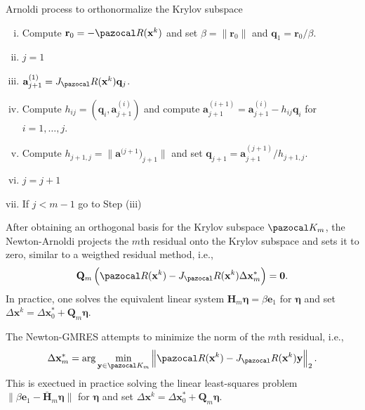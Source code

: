 \begin{framedbox}[htbp]
  \caption{Arnoldi process to orthonormalize the Krylov subspace}
  \label{box:arnoldi_process}
  \begin{center}
    \begin{minipage}{0.9\textwidth}
    \begin{enumerate}[(i)]
      \item Compute \(\mathbf r_0 = -\pazocal R(\mathbf x^k)\) and set \(\beta = \|\mathbf r_0\|\) and \(\mathbf q_1 = \mathbf r_0/\beta\).
      \item \(j=1\)
      \item \(\mathbf a^{(1)}_{j+1} = J_\pazocal R(\mathbf x^k) \mathbf q_j\).
      \item Compute \(h_{ij}=(\mathbf q_i, \mathbf a^{(i)}_{j+1})\) and compute \(\mathbf a^{(i+1)}_{j+1} = \mathbf a^{(i)}_{j+1} - h_{ij} \mathbf q_i\) for \(i=1,\dots,j\).
      \item Compute \(h_{j+1,j}=\|\mathbf a^{(j+1})_{j+1}\|\) and set \(\mathbf q_{j+1} = \mathbf a^{(j+1)}_{j+1}/h_{j+1,j}\).
      \item \(j=j+1\)
      \item If \(j<m-1\) go to Step (iii)
    \end{enumerate}
    \end{minipage}
  \end{center}
\end{framedbox}

After obtaining an orthogonal basis for the Krylov subspace \(\pazocal K_m\), the Newton-Arnoldi projects the \(m\)th residual onto the Krylov subspace and sets it to zero, similar to a weigthed residual method, i.e.,
\begin{equation}
  \mathbf Q_m \left(\pazocal R(\mathbf x^k) - J_\pazocal R(\mathbf x^k)\Delta \mathbf x^*_m\right) = \mathbf 0.
\end{equation}
In practice, one solves the equivalent linear system \(\mathbf H_m \boldsymbol{\eta} = \beta \mathbf e_1\) for \(\boldsymbol{\eta}\) and set \(\Delta \mathbf x^k  =\Delta \mathbf x^*_0 + \mathbf Q_m\boldsymbol \eta\).

The Newton-GMRES attempts to minimize the norm of the \(m\)th residual, i.e.,
\begin{equation}
  \Delta \mathbf x^*_m = \arg\min_{\mathbf y\in \pazocal K_m} \left\|\pazocal R(\mathbf x^k) - J_\pazocal R(\mathbf x^k)\mathbf y\right\|_2.
\end{equation}
This is exectued in practice solving the linear least-squares problem \(\|\beta\mathbf e_1 -\bar{\mathbf H}_m \boldsymbol{\eta}\|\) for \(\boldsymbol{\eta}\) and set \(\Delta \mathbf x^k  =\Delta \mathbf x^*_0 + \mathbf Q_m\boldsymbol \eta\).

